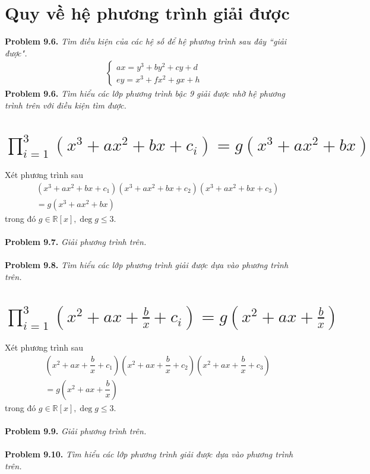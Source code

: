 \documentclass[a4paper,oneside]{book}
\numberwithin{equation}{chapter}
\begin{document}
\section{Quy về hệ phương trình giải được}
\textbf{Problem 9.6.} \textit{Tìm điều kiện của các hệ số để hệ phương trình sau đây ``giải được".}
\begin{align}
\left\{ {\begin{array}{*{20}{c}}
{ax = y{}^3 + b{y^2} + cy + d}\\
{ey = x{}^3 + f{x^2} + gx + h}
\end{array}} \right.
\end{align}
\textbf{Problem 9.6.} \textit{Tìm hiểu các lớp phương trình bậc 9 giải được nhờ hệ phương trình trên với điều kiện tìm được.}
\section{$\prod\limits_{i = 1}^3 {\left( {{x^3} + a{x^2} + bx + {c_i}} \right)}  = g\left( {{x^3} + a{x^2} + bx} \right)$}
Xét phương trình sau
\begin{align}
&\left( {x{}^3 + a{x^2} + bx + {c_1}} \right)\left( {x{}^3 + a{x^2} + bx + {c_2}} \right)\left( {x{}^3 + a{x^2} + bx + {c_3}} \right) \\
&= g\left( {x{}^3 + a{x^2} + bx} \right)
\end{align}
trong đó $g \in \mathbb{R} \left[ x \right],\deg g \le 3$.\\
\\
\textbf{Problem 9.7.} \textit{Giải phương trình trên.}\\
\\
\textbf{Problem 9.8.} \textit{Tìm hiểu các lớp phương trình giải được dựa vào phương trình trên.}
\section{$\prod\limits_{i = 1}^3 {\left( {{x^2} + ax + \frac{b}{x} + {c_i}} \right)}  = g\left( {{x^2} + ax + \frac{b}{x}} \right)$}
Xét phương trình sau
\begin{align}
&\left( {{x^2} + ax + \dfrac{b}{x} + {c_1}} \right)\left( {{x^2} + ax + \dfrac{b}{x} + {c_2}} \right)\left( {{x^2} + ax + \dfrac{b}{x} + {c_3}} \right) \\
&= g\left( {{x^2} + ax + \dfrac{b}{x}} \right)
\end{align}
trong đó $g \in \mathbb{R} \left[ x \right],\deg g \le 3$.\\
\\
\textbf{Problem 9.9.} \textit{Giải phương trình trên.}\\
\\
\textbf{Problem 9.10.} \textit{Tìm hiểu các lớp phương trình giải được dựa vào phương trình trên.}
\end{document}
